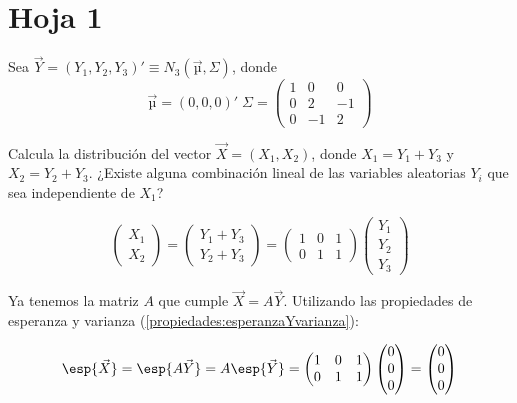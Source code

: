 \section{Hoja 1}

\begin{problem}[1]
Sea $\vec{Y} = (Y_1,Y_2,Y_3)' ≡ N_3(\vec{µ},Σ)$, donde \[\vec{µ} = (0,0,0)'\;
Σ =\begin{pmatrix}
1&0&0\\
0&2&−1\\
0&−1&2
\end{pmatrix}
\]


\ppart  Calcula la distribución del vector $\vec{X} = (X_1,X_2)$, donde $X_1 = Y_1 + Y_3$ y $X_2 = Y_2 + Y_3$.
\ppart ¿Existe alguna combinación lineal de las variables aleatorias $Y_i$ que sea independiente de $X_1$?

\solution
{}


\spart 
\[
\begin{pmatrix}X_1 \\ X_2 \end{pmatrix} = \begin{pmatrix} Y_1 + Y_3 \\ Y_2 + Y_3 \end{pmatrix} = \begin{pmatrix} 1&0&1\\0&1&1 \end{pmatrix} \begin{pmatrix} Y_1\\Y_2\\Y_3 \end{pmatrix} 
\]

Ya tenemos la matriz $A$ que cumple $\vec{X} = A \vec{Y}$. Utilizando las propiedades de esperanza y varianza (\ref{propiedades:esperanzaYvarianza}):

\[\esp{\vec{X}} = \esp{A\vec{Y}} = A\esp{\vec{Y}} = \begin{pmatrix} 1&0&1\\0&1&1 \end{pmatrix} \begin{pmatrix} 0 \\0\\0\end{pmatrix} = \begin{pmatrix} 0 \\0\\0\end{pmatrix}\]


\end{problem}
